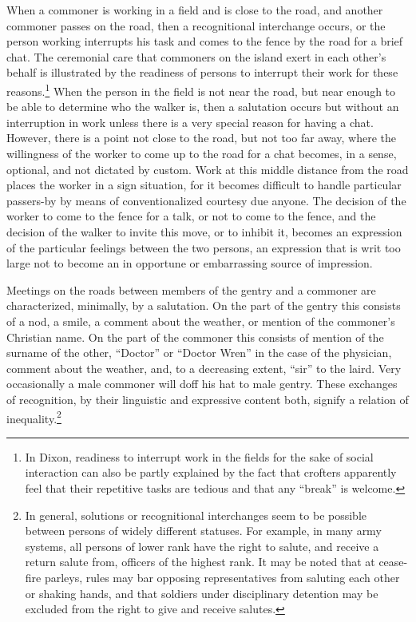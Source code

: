\documentclass[openany,nobib]{tufte-book}
\begin{document}
\enlargethispage{\baselineskip}

When a commoner is working in a field and is close to the road, and
another commoner passes on the road, then a recognitional interchange
occurs, or the person working interrupts his task and comes to the fence
by the road for a brief chat. The ceremonial care that commoners on the
island exert in each other's behalf is illustrated by the readiness of
persons to interrupt their work for these reasons.\footnote{In Dixon,
  readiness to interrupt work in the fields for the sake of social
  interaction can also be partly explained by the fact that crofters
  apparently feel that their repetitive tasks are tedious and that any
  ``break'' is welcome.} When the person in the field is not near the
road, but near enough to be able to determine who the walker is, then a
salutation occurs but without an interruption in work unless there is a
very special reason for having a chat. However, there is a point not
close to the road, but not too far away, where the willingness of the
worker to come up to the road for a chat becomes, in a sense, optional,
and not dictated by custom. Work at this middle distance from the road
places the worker in a sign situation, for it becomes difficult to
handle particular passers-by by means of conventionalized courtesy due
anyone. The decision of the worker to come to the fence for a talk, or
not to come to the fence, and the decision of the walker to invite this
move, or to inhibit it, becomes an expression of the particular feelings
between the two persons, an expression that is writ too large not to
become an in opportune or embarrassing source of impression.

Meetings on the roads between members of the gentry and a commoner are
characterized, minimally, by a salutation. On the part of the gentry
this consists of a nod, a smile, a comment about the weather, or mention
of the commoner's Christian name. On the part of the commoner this
consists of mention of the surname of the other, ``Doctor'' or ``Doctor
Wren'' in the case of the physician, comment about the weather, and, to
a decreasing extent, ``sir'' to the laird. Very occasionally a male
commoner will doff his hat to male gentry. These exchanges of
recognition, by their linguistic and expressive content both, signify a
relation of inequality.\footnote{In general, solutions or recognitional
  interchanges seem to be possible between persons of widely different
  statuses. For example, in many army systems, all persons of lower rank
  have the right to salute, and receive a return salute from, officers
  of the highest rank. It may be noted that at cease-fire parleys, rules
  may bar opposing representatives from saluting each other or shaking
  hands, and that soldiers under disciplinary detention may be excluded
  from the right to give and receive salutes.}
\end{document}
